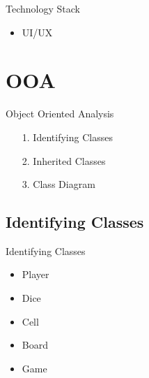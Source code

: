 \documentclass{beamer}
\begin{document}
\begin{frame}{Technology Stack}
\begin{itemize}
    \item <7-> [4.] UI/UX
\end{itemize}
\end{frame}
\section{OOA}
\begin{frame}{Object Oriented Analysis}
    \begin{itemize}
        \item[1.] Identifying Classes
        \item[2.] Inherited Classes
        \item[3.] Class Diagram
    \end{itemize}
\end{frame}
\subsection{Identifying Classes}
\begin{frame}{Identifying Classes}
    \begin{itemize}
        \item Player
        \item Dice
        \item Cell
        \item Board
        \item Game
    \end{itemize}
\end{frame}
\end{document}
